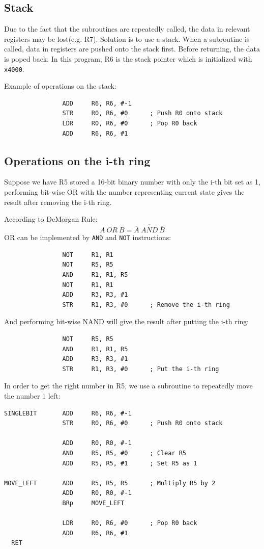 \documentclass[UTF8]{ctexart}
\begin{document}
\subsection{Stack}
Due to the fact that the subroutines are repeatedly called, the data in relevant
registers may be lost(e.g. R7). Solution is to use a stack. When a subroutine is called,
data in registers are pushed onto the stack first. Before returning, the data is poped back.
In this program, R6 is the stack pointer which is initialized with \lstinline{x4000}. 

Example of operations on the stack:
\begin{lstlisting}
                ADD     R6, R6, #-1
                STR     R0, R6, #0      ; Push R0 onto stack
                LDR     R0, R6, #0      ; Pop R0 back
                ADD     R6, R6, #1
\end{lstlisting}
\subsection{Operations on the i-th ring}
Suppose we have R5 stored a 16-bit binary number with only the i-th bit set as 1, performing 
bit-wise OR with the number representing current state gives the result after removing
the i-th ring.

According to DeMorgan Rule:
\[A\ OR\ B = \overline{\overline{A}\ AND\ \overline{B}}\]
OR can be implemented by \lstinline{AND} and \lstinline{NOT} instructions:
\begin{lstlisting}
                NOT     R1, R1
                NOT     R5, R5
                AND     R1, R1, R5
                NOT     R1, R1
                ADD     R3, R3, #1
                STR     R1, R3, #0      ; Remove the i-th ring
\end{lstlisting}

And performing bit-wise NAND will give the result after putting the i-th ring:
\begin{lstlisting}
                NOT     R5, R5
                AND     R1, R1, R5      
                ADD     R3, R3, #1
                STR     R1, R3, #0      ; Put the i-th ring
\end{lstlisting}

In order to get the right number in R5, we use a subroutine to repeatedly move the number 1 left:
\begin{lstlisting}
SINGLEBIT       ADD     R6, R6, #-1
                STR     R0, R6, #0      ; Push R0 onto stack
                
                ADD     R0, R0, #-1
                AND     R5, R5, #0      ; Clear R5
                ADD     R5, R5, #1      ; Set R5 as 1
  
MOVE_LEFT       ADD     R5, R5, R5      ; Multiply R5 by 2
                ADD     R0, R0, #-1
                BRp     MOVE_LEFT
                
                LDR     R0, R6, #0      ; Pop R0 back
                ADD     R6, R6, #1
  RET
\end{lstlisting}
\end{document}
